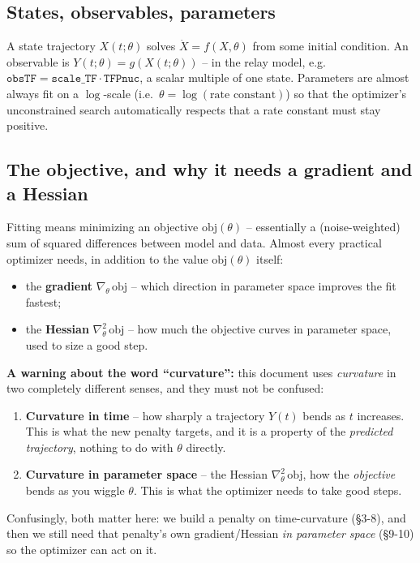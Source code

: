 \documentclass[11pt]{article}
\newcommand{\code}[1]{\texttt{#1}}
\begin{document}
\subsection{States, observables, parameters}
A state trajectory $X(t;\theta)$ solves $\dot X = f(X,\theta)$ from some
initial condition. An observable is $Y(t;\theta) = g(X(t;\theta))$ -- in the
relay model, e.g.\ $\code{obsTF} = \code{scale\_TF}\cdot\code{TFPnuc}$, a
scalar multiple of one state. Parameters are almost always fit on a
$\log$-scale (i.e.\ $\theta = \log(\text{rate constant})$) so that the
optimizer's unconstrained search automatically respects that a rate
constant must stay positive.

\subsection{The objective, and why it needs a gradient and a Hessian}
Fitting means minimizing an objective $\mathrm{obj}(\theta)$ -- essentially
a (noise-weighted) sum of squared differences between model and data. Almost
every practical optimizer needs, in addition to the value
$\mathrm{obj}(\theta)$ itself:
\begin{itemize}[nosep]
  \item the \textbf{gradient} $\nabla_\theta\,\mathrm{obj}$ -- which
  direction in parameter space improves the fit fastest;
  \item the \textbf{Hessian} $\nabla^2_\theta\,\mathrm{obj}$ -- how much the
  objective curves in parameter space, used to size a good step.
\end{itemize}

\textbf{A warning about the word ``curvature'':} this document uses
\emph{curvature} in two completely different senses, and they must not be
confused:
\begin{enumerate}[nosep]
  \item \textbf{Curvature in time} -- how sharply a trajectory $Y(t)$ bends
  as $t$ increases. This is what the new penalty targets, and it is a
  property of the \emph{predicted trajectory}, nothing to do with $\theta$
  directly.
  \item \textbf{Curvature in parameter space} -- the Hessian
  $\nabla^2_\theta\,\mathrm{obj}$, how the \emph{objective} bends as you
  wiggle $\theta$. This is what the optimizer needs to take good steps.
\end{enumerate}
Confusingly, both matter here: we build a penalty on time-curvature (\S3-8),
and then we still need that penalty's own gradient/Hessian \emph{in
parameter space} (\S9-10) so the optimizer can act on it.
\end{document}
